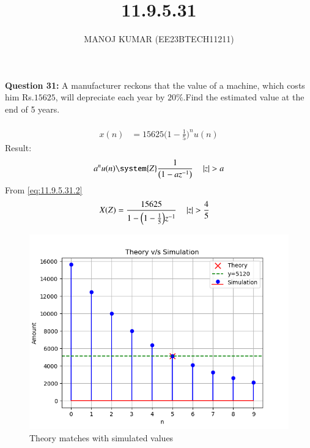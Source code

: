 \documentclass[journal,12pt,twocolumn]{IEEEtran}
\theoremstyle{remark}
\begin{document}

\vspace{3cm}

\title{11.9.5.31}
\author{MANOJ KUMAR (EE23BTECH11211)}
\maketitle
\newpage

\bigskip

\renewcommand{\thefigure}{\theenumi}
\renewcommand{\thetable}{\theenumi}
\textbf{Question 31:}
A manufacturer reckons that the value of a machine, which costs him Rs.$15625$, will depreciate each year by $20\%$.Find the estimated value at the end of 5 years.\\
\solution\\

 \begin{align}
     x(n) &= 15625 \Big(1-\frac{1}{5}\Big)^{n}u(n)
 \end{align}
 Result:
 \begin{align}
  a^nu(n)\system{Z} \frac{1}{\brak{1-az^{-1}}}\quad\abs{z}>{a} 
  \label{eq:11.9.5.31.2}	 
  \end{align}
 From \eqref{eq:11.9.5.31.2}
\begin{align}
    X(Z) &= \frac{15625}{1 - \Big(1-\frac{1}{5}\Big)z^{-1}} \quad\left\vert z\right\vert>\frac{4}{5}
\end{align}
 \begin{figure}[!ht]
    \centering
    \includegraphics[width=1\linewidth]{figs/plot2.png}
    \caption{Theory matches with simulated values}
    \label{fig:enter-label}
\end{figure}
\end{document}
